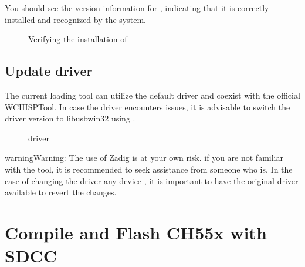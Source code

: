 \documentclass[letterpaper,10pt,english]{sphinxmanual}
\begin{document}
\begin{sphinxVerbatim}[commandchars=\\\{\}]
 
\end{sphinxVerbatim}

\sphinxAtStartPar
You should see the version information for , indicating that it is correctly installed and recognized by the system.

\begin{figure}[htbp]
\centering
\capstart

\noindent{}
\caption{Verifying the installation of }\label{\detokenize{install_windows:id6}}\label{\detokenize{install_windows:verify}}\end{figure}


\section{Update driver}
\label{\detokenize{install_windows:update-driver}}
\sphinxAtStartPar
The current loading tool can utilize the default driver and coexist with the official WCHISPTool. In case the driver encounters issues, it is advisable to switch the driver version to libusb\sphinxhyphen{}win32 using .

\begin{figure}[htbp]
\centering
\capstart

\noindent{}
\caption{driver}\label{\detokenize{install_windows:id7}}\label{\detokenize{install_windows:driver}}\end{figure}

\begin{sphinxadmonition}{warning}{Warning:}
\sphinxAtStartPar
The use of Zadig is at your own risk. if you are not familiar with the tool, it is recommended to seek assistance from someone who is. In the case of changing the driver any device  , it is important to have the original driver available to revert the changes.
\end{sphinxadmonition}

\sphinxstepscope


\chapter{Compile and Flash CH55x with SDCC}
\label{\detokenize{compile:compile-and-flash-ch55x-with-sdcc}}\label{\detokenize{compile::doc}}
\end{document}
